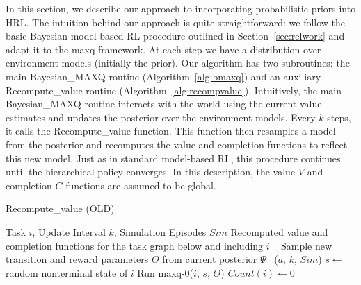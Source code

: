 In this section, we describe our approach to incorporating
probabilistic priors into HRL. The intuition behind our approach is
quite straightforward: we follow the basic Bayesian model-based RL
procedure outlined in Section~\ref{sec:relwork} and adapt it to the
{\sc maxq} framework. At each step we have a distribution over
environment models (initially the prior). Our algorithm has two
subroutines: the main {\sc Bayesian\_MAXQ} routine
(Algorithm~\ref{alg:bmaxq}) and an auxiliary {\sc Recompute\_value}
routine (Algorithm~\ref{alg:recompvalue}). Intuitively, the main {\sc
  Bayesian\_MAXQ} routine interacts with the world using the current
value estimates and updates the posterior over the environment models.
Every $k$ steps, it calls the {\sc Recompute\_value} function. This
function then resamples a model from the posterior and recomputes the
value and completion functions to reflect this new model. Just as in
standard model-based RL, this procedure continues until the
hierarchical policy converges. In this description, the value $V$ and
completion $C$ functions are assumed to be global.


 \begin{algorithm}[t]
 \caption{{\sc Recompute\_value} (OLD)} \label{alg:recompvalue}
 \begin{algorithmic}[1]
 \REQUIRE Task $i$, Update Interval $k$, Simulation Episodes $Sim$
 \ENSURE Recomputed value and completion functions for the task graph below and including $i$
 \RETURN~\label{line:checkk}
 \ENDIF
 \STATE Sample new transition and reward parameters $\Theta$ from
 current posterior $\Psi$~\label{line:sample}
 \ELSE
 ($a$, $k$, $Sim$)
 \ENDFOR
 \STATE $s \leftarrow$ random nonterminal state of $i$
 \STATE Run {\sc maxq-0}($i$, $s$, $\Theta$) 
 \ENDFOR
 \ENDIF
 \STATE $Count(i) \leftarrow 0$
 \end{algorithmic}
 \end{algorithm} 


